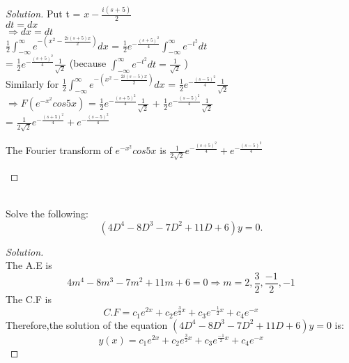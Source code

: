 \documentclass[12pt]{article}
\newenvironment{problem}[2][Problem]{\begin{trivlist}
\item[\hskip \labelsep {\bfseries #1}\hskip \labelsep {\bfseries #2.}]}{\end{trivlist}}
\begin{document}
\begin{proof}[Solution]
         Put    t = $ x-\frac{i(s+5)}{2}$ \\
         
                   $ dt = dx$  \\
                   
                  $ \Rightarrow  dx = dt $  \\
                  
$\frac{1}{2} \int_{-\infty}^{\infty} e^{-(x^2-\frac{2i(s+5)x}{2})} dx $  =  $\frac{1}{2}  e^{-\frac{(s+5)^2}{4}}   \int_{-\infty}^{\infty} e^{-t^2} dt $ \\

                                           =   $\frac{1}{2}  e^{-\frac{(s+5)^2}{4}} \frac{1}{\sqrt{2}} $  (because   $\int_{-\infty}^{\infty} e^{-t^2} dt  =  \frac{1}{\sqrt{2}}$ )\\
                                           
    Similarly for   $\frac{1}{2} \int_{-\infty}^{\infty} e^{-(x^2-\frac{2i(s-5)x}{2})} dx $  =   $\frac{1}{2}  e^{-\frac{(s-5)^2}{4}} \frac{1}{\sqrt{2}} $   \\
    
    $\Rightarrow F( e^{-x^2}  cos{5x} ) $  =   $\frac{1}{2}  e^{-\frac{(s+5)^2}{4}} \frac{1}{\sqrt{2}} $  +    $\frac{1}{2}  e^{-\frac{(s-5)^2}{4}} \frac{1}{\sqrt{2}} $   \\
    
                                      =  $ \frac{1}{2\sqrt{2}}  e^{-\frac{(s+5)^2}{4}}  +   e^{-\frac{(s-5)^2}{4}}  $ \\
                                     
\begin{Large}
The Fourier transform of $ e^{-x^2}  cos{5x}$  is    $ \frac{1}{2\sqrt{2}}  e^{-\frac{(s+5)^2}{4}}  +   e^{-\frac{(s-5)^2}{4}}  $ 
\end{Large}
\end{proof}

\begin{problem}{9}
\text{ }\\
Solve the following:\\
$$(4D^4 - 8D^3 - 7D^2 + 11D + 6)y = 0.$$
\end{problem}
\begin{proof}[Solution]
\text{ }\\
The  A.E  is\\
$$ 4m^4 - 8m^3 - 7m^2 + 11m + 6 = 0  \Rightarrow  m = 2,\frac{3}{2},\frac{-1}{2},-1$$
The  C.F  is\\
$$ C.F  =  c_1e^{2x}+c_2e^{\frac{3}{2}x}+c_3e^{-\frac{1}{2}x}+c_4e^{-x}$$
Therefore,the solution of the equation $(4D^4 - 8D^3 - 7D^2 + 11D + 6)y = 0$ is:\\ 
$$y(x) =  c_1e^{2x}+c_2e^{\frac{3}{2}x}+c_3e^{\frac{-1}{2}x}+c_4e^{-x}$$
\end{proof}
\end{document}
